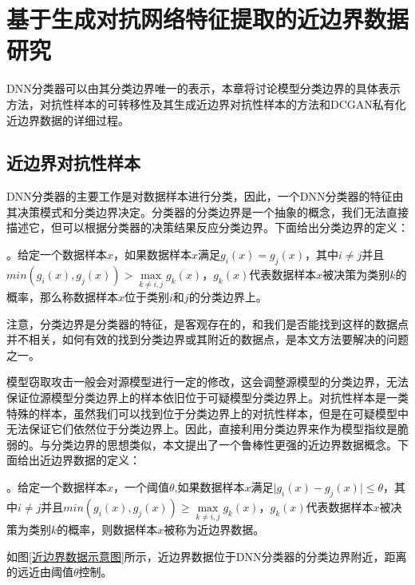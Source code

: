 
\chapter{基于生成对抗网络特征提取的近边界数据研究}\label{3}

DNN分类器可以由其分类边界唯一的表示，本章将讨论模型分类边界的具体表示方法，对抗性样本的可转移性及其生成近边界对抗性样本的方法和DCGAN私有化近边界数据的详细过程。

\section{近边界对抗性样本}

DNN分类器的主要工作是对数据样本进行分类，因此，一个DNN分类器的特征由其决策模式和分类边界决定。分类器的分类边界是一个抽象的概念，我们无法直接描述它，但可以根据分类器的决策结果反应分类边界。下面给出分类边界的定义：

\begin{myDef}
	\label{def:1}
	。给定一个数据样本$x$，如果数据样本$x$满足$g_i(x) = g_j(x)$，其中$i \neq j $并且$min(g_i(x), g_j(x)) > \mathop{max} \limits_{k \neq i, j}g_k(x)$，$g_k(x)$代表数据样本$x$被决策为类别$k$的概率，那么称数据样本$x$位于类别$i$和$j$的分类边界上。
\end{myDef}

注意，分类边界是分类器的特征，是客观存在的，和我们是否能找到这样的数据点并不相关，如何有效的找到分类边界或其附近的数据点，是本文方法要解决的问题之一。

模型窃取攻击一般会对源模型进行一定的修改，这会调整源模型的分类边界，无法保证位源模型分类边界上的样本依旧位于可疑模型分类边界上。对抗性样本是一类特殊的样本，虽然我们可以找到位于分类边界上的对抗性样本，但是在可疑模型中无法保证它们依然位于分类边界上。因此，直接利用分类边界来作为模型指纹是脆弱的。与分类边界的思想类似，本文提出了一个鲁棒性更强的近边界数据概念。下面给出近边界数据的定义：

\begin{myDef}
	\label{def:2}
	。给定一个数据样本$x$，一个阈值$\theta$,如果数据样本$x$满足$\vert g_i(x) - g_j(x) \vert \leq \theta$，其中$i \neq j $并且$min(g_i(x), g_j(x)) \geq \mathop{max} \limits_{k \neq i, j}g_k(x)$，$g_k(x)$代表数据样本$x$被决策为类别$k$的概率，则数据样本$x$被称为近边界数据。
\end{myDef}

如图\ref{近边界数据示意图}所示，近边界数据位于DNN分类器的分类边界附近，距离的远近由阈值$\theta$控制。

